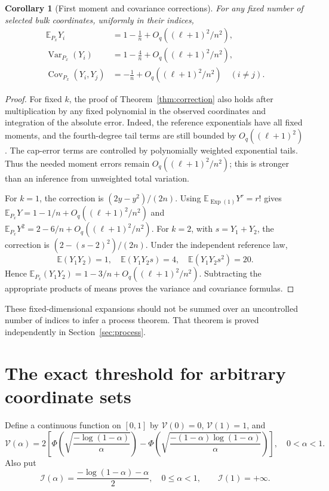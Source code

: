 \documentclass[11pt,letterpaper]{article}
\numberwithin{equation}{section}
\newtheorem{corollary}[theorem]{Corollary}
\theoremstyle{definition}
\theoremstyle{remark}
\newcommand{\EE}{\mathbb E}
\newcommand{\Exp}{\operatorname{Exp}}
\newcommand{\Var}{\operatorname{Var}}
\newcommand{\Cov}{\operatorname{Cov}}
\newcommand{\vp}{\mathcal V}
\newcommand{\ip}{\mathcal I}
\begin{document}
\begin{corollary}[First moment and covariance corrections]
\label{cor:moments}
For any fixed number of selected bulk coordinates, uniformly in their indices,
\begin{align}
 \EE_{P_x}Y_i&=1-\frac1n+O_q((\ell+1)^2/n^2),\label{eq:meanfirst}\\
 \Var_{P_x}(Y_i)&=1-\frac4n+O_q((\ell+1)^2/n^2),\label{eq:varfirst}\\
 \Cov_{P_x}(Y_i,Y_j)&=-\frac1n+O_q((\ell+1)^2/n^2)
 \quad(i\ne j).\label{eq:covfirst}
\end{align}
\end{corollary}
\begin{proof}
For fixed $k$, the proof of Theorem~\ref{thm:correction} also holds after
multiplication by any fixed polynomial in the observed coordinates and
integration of the absolute error. Indeed, the reference exponentials have
all fixed moments, and the fourth-degree tail terms are still bounded by
$O_q((\ell+1)^2)$. The cap-error terms are controlled by polynomially weighted
exponential tails. Thus the needed moment errors remain
$O_q((\ell+1)^2/n^2)$; this is stronger than an inference from unweighted
total variation.

For $k=1$, the correction is $(2y-y^2)/(2n)$. Using
$\EE_{\Exp(1)}Y^r=r!$ gives
$\EE_{P_x}Y=1-1/n+O_q((\ell+1)^2/n^2)$ and
$\EE_{P_x}Y^2=2-6/n+O_q((\ell+1)^2/n^2)$.
For $k=2$, with $s=Y_1+Y_2$, the correction is
$(2-(s-2)^2)/(2n)$. Under the independent reference law,
\[
 \EE(Y_1Y_2)=1,\quad
 \EE(Y_1Y_2s)=4,\quad
 \EE(Y_1Y_2s^2)=20.
\]
Hence $\EE_{P_x}(Y_1Y_2)=1-3/n+O_q((\ell+1)^2/n^2)$.
Subtracting the appropriate products of means proves the variance and
covariance formulas.
\end{proof}

These fixed-dimensional expansions should not be summed over an uncontrolled
number of indices to infer a process theorem. That theorem is proved
independently in Section~\ref{sec:process}.

\section{The exact threshold for arbitrary coordinate sets}
\label{sec:mask}

Define a continuous function on $[0,1]$ by $\vp(0)=0$, $\vp(1)=1$, and
\begin{equation}
 \vp(\alpha)=2\left[
 \Phi\!\left(\sqrt{\frac{-\log(1-\alpha)}{\alpha}}\right)
 -\Phi\!\left(\sqrt{\frac{-(1-\alpha)\log(1-\alpha)}{\alpha}}\right)
 \right],\quad0<\alpha<1.
 \label{eq:profile}
\end{equation}
Also put
\begin{equation}
 \ip(\alpha)=\frac{-\log(1-\alpha)-\alpha}{2},\quad0\le\alpha<1,
 \qquad \ip(1)=+\infty.
 \label{eq:entropyprofile}
\end{equation}
\end{document}
